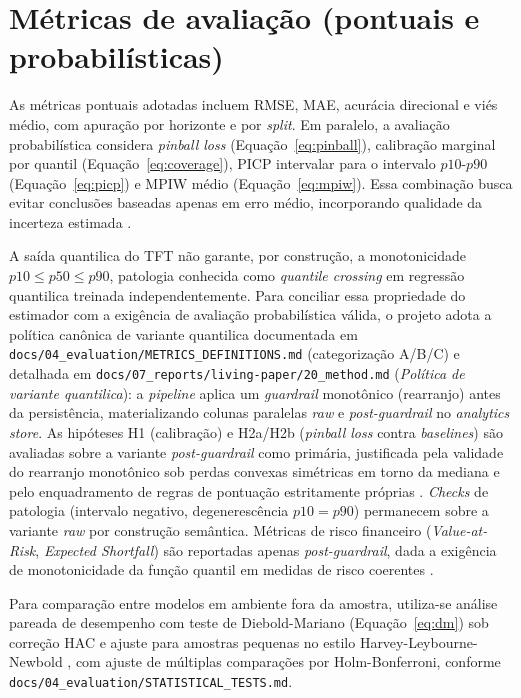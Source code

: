 \section{Métricas de avaliação (pontuais e probabilísticas)}
As métricas pontuais adotadas incluem RMSE, MAE, acurácia direcional e viés médio, com apuração por horizonte e por \textit{split}. Em paralelo, a avaliação probabilística considera \textit{pinball loss} (Equação~\ref{eq:pinball}), calibração marginal por quantil (Equação~\ref{eq:coverage}), PICP intervalar para o intervalo \(p10\)-\(p90\) (Equação~\ref{eq:picp}) e MPIW médio (Equação~\ref{eq:mpiw}). Essa combinação busca evitar conclusões baseadas apenas em erro médio, incorporando qualidade da incerteza estimada \cite{GNEITING2007}.

A saída quantilica do TFT não garante, por construção, a monotonicidade \(p10 \leq p50 \leq p90\), patologia conhecida como \textit{quantile crossing} em regressão quantilica treinada independentemente. Para conciliar essa propriedade do estimador com a exigência de avaliação probabilística válida, o projeto adota a política canônica de variante quantilica documentada em \texttt{docs/04\_evaluation/METRICS\_DEFINITIONS.md} (categorização A/B/C) e detalhada em \texttt{docs/07\_reports/living-paper/20\_method.md} (\textit{Política de variante quantilica}): a \textit{pipeline} aplica um \textit{guardrail} monotônico (rearranjo) antes da persistência, materializando colunas paralelas \textit{raw} e \textit{post-guardrail} no \textit{analytics store}. As hipóteses H1 (calibração) e H2a/H2b (\textit{pinball loss} contra \textit{baselines}) são avaliadas sobre a variante \textit{post-guardrail} como primária, justificada pela validade do rearranjo monotônico sob perdas convexas simétricas em torno da mediana \cite{CHERNOZHUKOV2010REARRANGEMENT} e pelo enquadramento de regras de pontuação estritamente próprias \cite{GNEITING2007}. \textit{Checks} de patologia (intervalo negativo, degenerescência \(p10 = p90\)) permanecem sobre a variante \textit{raw} por construção semântica. Métricas de risco financeiro (\textit{Value-at-Risk}, \textit{Expected Shortfall}) são reportadas apenas \textit{post-guardrail}, dada a exigência de monotonicidade da função quantil em medidas de risco coerentes \cite{JORION2007,ACERBI2002}.

Para comparação entre modelos em ambiente fora da amostra, utiliza-se análise pareada de desempenho com teste de Diebold-Mariano \cite{DIEBOLDMARIANO1995} (Equação~\ref{eq:dm}) sob correção HAC e ajuste para amostras pequenas no estilo Harvey-Leybourne-Newbold \cite{HARVEY1997}, com ajuste de múltiplas comparações por Holm-Bonferroni, conforme \texttt{docs/04\_evaluation/STATISTICAL\_TESTS.md}.

